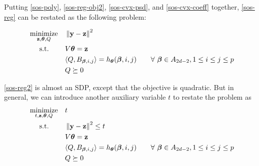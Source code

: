 \documentclass[11pt]{article}
\begin{document}
Putting \eqref{sos-poly}, \eqref{sos-reg-obj2}, \eqref{sos-cvx-psd}, and \eqref{sos-cvx-coeff} together, \eqref{sos-reg} can be restated as the following problem:

\begin{equation}\label{sos-reg2}
\begin{aligned}
& \underset{{\bf z}, {\boldsymbol\theta}, Q}{\text{minimize}}
& & \left\lVert {\bf y}-{\bf z} \right\rVert^2 \\
& \text{\quad\ s.t.}
& &  V{\boldsymbol\theta} = {\bf z} \\
& & & \langle{Q, B_{{\boldsymbol\beta}, i, j}} \rangle = h_{\boldsymbol\theta}({\boldsymbol\beta}, i, j) \qquad \forall\ {\boldsymbol\beta} \in A_{2d - 2}, 1 \le i \le j \le p \\
& & & Q \succeq 0 
\end{aligned}
\end{equation}

\eqref{sos-reg2} is almost an SDP, except that the objective is quadratic. But in general, we can introduce another auxiliary variable $t$ to restate the problem as
\begin{equation}\label{sos-reg3}
\begin{aligned}
& \underset{t, {\bf z}, {\boldsymbol\theta}, Q}{\text{minimize}}
& & t \\
& \text{\quad\ s.t.}
& & \left\lVert {\bf y}-{\bf z} \right\rVert^2 \leq t \\
& & & V{\boldsymbol\theta} = {\bf z} \\
& & & \langle{Q, B_{{\boldsymbol\beta}, i, j}} \rangle = h_{\boldsymbol\theta}({\boldsymbol\beta}, i, j) \qquad \forall\ {\boldsymbol\beta} \in A_{2d - 2}, 1 \le i \le j \le p \\
& & & Q \succeq 0 
\end{aligned}
\end{equation}
\end{document}
